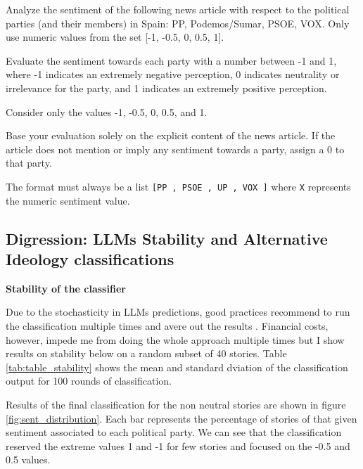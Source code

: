 \documentclass[12pt]{article}
\begin{document}
	
	\begin{tcolorbox}[colback=blue!5!white, colframe=blue!75!black, title=Prompt]
		Analyze the sentiment of the following news article with respect to the political parties (and their members) in Spain: PP, Podemos/Sumar, PSOE, VOX. Only use numeric values from the set [-1, -0.5, 0, 0.5, 1].
		
		Evaluate the sentiment towards each party with a number between -1 and 1, where -1 indicates an extremely negative perception, 0 indicates neutrality or irrelevance for the party, and 1 indicates an extremely positive perception.
		
		Consider only the values -1, -0.5, 0, 0.5, and 1.
		
		Base your evaluation solely on the explicit content of the news article. If the article does not mention or imply any sentiment towards a party, assign a 0 to that party.
		
		The format must always be a list \texttt{[PP
			, PSOE
			, UP
			, VOX
			]} where \texttt{X} represents the numeric sentiment value.
		
		
	\end{tcolorbox}
	
	
		\subsection{ Digression: LLMs Stability and Alternative Ideology classifications }
	\label{sec:sent_stability}
	
	
	\textbf{Stability of the classifier}
	
	Due to the stochasticity in LLMs predictions, good practices recommend to run the classification multiple times and avere out the results \citep{tornberg2023}. Financial costs, however, impede me from doing the whole approach multiple times but I show results on stability below on a random subset of  40 stories. Table \ref{tab:table_stability} shows the mean and standard dviation of the classification output for 100 rounds of classification. 
	
	Results of the final classification for the non neutral stories are shown in figure \ref{fig:sent_distribution}. Each bar represents the percentage of stories of that given sentiment associated to each political party. We can see that the classification reserved the extreme values 1 and -1 for few stories and focused on the -0.5 and 0.5 values. 
	
\end{document}
